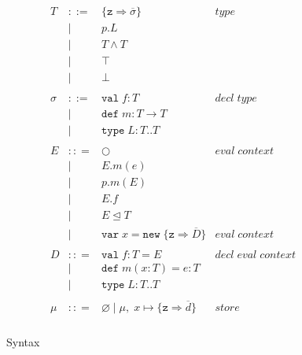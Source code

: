 \documentclass{llncs}
\begin{document}
\begin{figure}[h]
\[\begin{array}{lll}
\begin{array}{lllr}
T & ::= & \{\texttt{z} \Rightarrow \overline{\sigma}\} & type \\
& | & p.L &\\
& | & T \wedge T & \\
& | & \top & \\
& | & \bot & \\
&&\\
\sigma & ::= & \texttt{val} \; f:T & decl \; type\\
       & |   & \texttt{def} \; m:T \rightarrow T \\
		 & |   & \texttt{type} \; L : T .. T &\\
&&\\
E & :: = & \bigcirc & eval \; context\\
       & | & E.m(e)\\
       & | & p.m(E)\\
       & | & E.f\\
       & | & E \unlhd T\\
       & | & \texttt{var} \; x = \texttt{new} \; \{\texttt{z} \Rightarrow \overline{D}\} & eval \; context \\
&&\\
D & :: = & \texttt{val} \; f : T = E & decl \; eval \; context \\
  & |   & \texttt{def} \; m(x:T) = e : T &\\
  & |   & \texttt{type} \; L : T .. T &\\
&&\\
\mu & :: = & \varnothing \; | \; \mu,\; x \mapsto \{\texttt{z} \Rightarrow \overline{d}\} & store \\
\end{array}
\end{array}
\]
\caption{Syntax}
\label{f:syntax}
\end{figure}
\end{document}
